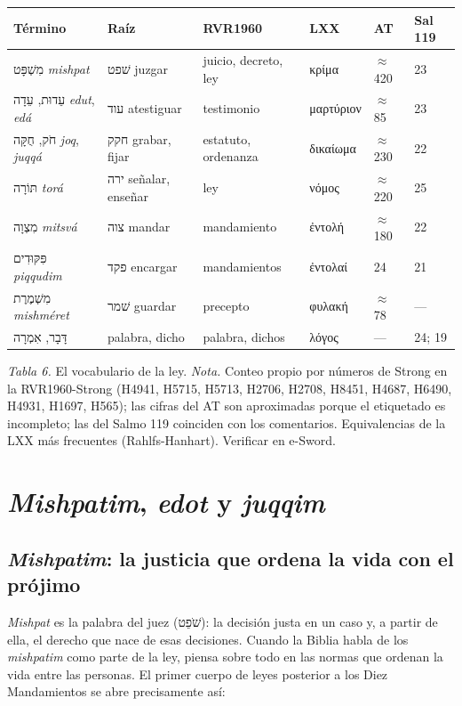 \documentclass[11pt,letterpaper]{article}
\newcommand{\heb}[1]{\mbox{\foreignlanguage{hebrew}{#1}}}
\newcommand{\grc}[1]{\foreignlanguage{ancientgreek}{#1}}
\begin{document}
\begin{center}\small\renewcommand{\arraystretch}{1.18}
\begin{tabular}{@{}L{2.9cm}L{4.0cm}L{2.6cm}L{1.6cm}L{1.3cm}L{1.2cm}@{}}
\toprule
\textbf{Término} & \textbf{Raíz} & \textbf{RVR1960} & \textbf{LXX} & \textbf{AT} & \textbf{Sal 119} \\ \midrule
\heb{מִשְׁפָּט} \emph{mishpat} & \heb{שׁפט} juzgar & juicio, decreto, ley & \grc{κρίμα} & $\approx$420 & 23 \\
\heb{עֵדוּת}, \heb{עֵדָה} \emph{edut}, \emph{edá} & \heb{עוד} atestiguar & testimonio & \grc{μαρτύριον} & $\approx$85 & 23 \\
\heb{חֹק}, \heb{חֻקָּה} \emph{joq}, \emph{juqqá} & \heb{חקק} grabar, fijar & estatuto, ordenanza & \grc{δικαίωμα} & $\approx$230 & 22 \\
\heb{תּוֹרָה} \emph{torá} & \heb{ירה} señalar, enseñar & ley & \grc{νόμος} & $\approx$220 & 25 \\
\heb{מִצְוָה} \emph{mitsvá} & \heb{צוה} mandar & mandamiento & \grc{ἐντολή} & $\approx$180 & 22 \\
\heb{פִּקּוּדִים} \emph{piqqudim} & \heb{פקד} encargar & mandamientos & \grc{ἐντολαί} & 24 & 21 \\
\heb{מִשְׁמֶרֶת} \emph{mishméret} & \heb{שׁמר} guardar & precepto & \grc{φυλακή} & $\approx$78 & --- \\
\heb{דָּבָר}, \heb{אִמְרָה} & palabra, dicho & palabra, dichos & \grc{λόγος} & --- & 24; 19 \\
\bottomrule
\end{tabular}\par
{\footnotesize\color{gris}\textit{Tabla 6.} El vocabulario de la ley. \textit{Nota.} Conteo propio por números de Strong en la RVR1960-Strong (H4941, H5715, H5713, H2706, H2708, H8451, H4687, H6490, H4931, H1697, H565); las cifras del AT son aproximadas porque el etiquetado es incompleto; las del Salmo 119 coinciden con los comentarios. Equivalencias de la LXX más frecuentes (Rahlfs-Hanhart). Verificar en e-Sword.}
\end{center}

\section{\emph{Mishpatim}, \emph{edot} y \emph{juqqim}}

\subsection{\emph{Mishpatim}: la justicia que ordena la vida con el prójimo}
\emph{Mishpat} es la palabra del juez (\heb{שֹׁפֵט}): la decisión justa en un caso y, a partir de ella, el derecho que nace de esas decisiones. Cuando la Biblia habla de los \emph{mishpatim} como parte de la ley, piensa sobre todo en las normas que ordenan la vida entre las personas. El primer cuerpo de leyes posterior a los Diez Mandamientos se abre precisamente así:
\end{document}
